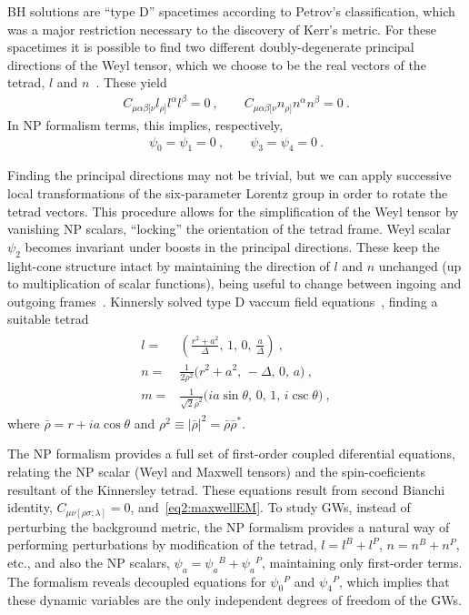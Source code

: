 BH solutions are ``type D'' spacetimes according to Petrov's classification, which was a major restriction necessary to the discovery of Kerr's metric.
For these spacetimes it is possible to find two different doubly-degenerate principal directions of the Weyl tensor, which we choose to be the real vectors of the tetrad, $l$ and $n$~\cite{Chandrasekhar1998}.
These yield
\begin{align}
    C_{\mu\alpha\beta[\nu} l_{\rho]} l^\alpha l^\beta = 0 ~, \qquad C_{\mu\alpha\beta[\nu} n_{\rho]} n^\alpha n^\beta = 0  ~.
\end{align}
In NP formalism terms, this implies, respectively,
\begin{align}
    \psi_0=\psi_1=0 ~,\qquad \psi_3=\psi_4=0 ~.
\end{align}

Finding the principal directions may not be trivial, but we can apply successive local transformations of the six-parameter Lorentz group in order to rotate the tetrad vectors. 
This procedure allows for the simplification of the Weyl tensor by vanishing NP scalars, ``locking'' the orientation of the tetrad frame.
Weyl scalar $\psi_2$ becomes invariant under boosts in the principal directions.
These keep the light-cone structure intact by maintaining the direction of $l$ and $n$ unchanged (up to multiplication of scalar functions), being useful to change between ingoing and outgoing frames~\cite{Teukolsky1974}. 
Kinnersly solved type D vaccum field equations~\cite{Kinnersley1969}, finding a suitable tetrad 
\begin{align}
    \begin{split}
        l =& \left(\frac{r^2+a^2}{\Delta}, \, 1, \,0, \,\frac{a}{\Delta} \right) ~, \\
        n =& \frac{1}{2 \rho^2} \Bigr( r^2+a^2, \,-\Delta, \,0 , \,a \Bigr) ~, \\
        m =& \frac{1}{ \sqrt{2} \bar{\rho}^2 } \Bigr( i a \sin\theta, \,0, \,1, \, i \csc\theta \Bigr) ~,
    \end{split}
    \label{eq3:kinnerslytetrad}
\end{align}
where $\bar{\rho} = r + i a \cos\theta$ and $\rho^2 \equiv | \bar{\rho} |^2 = \bar{\rho} \bar{\rho}^*$.

The NP formalism provides a full set of first-order coupled diferential equations, relating the NP scalar (Weyl and Maxwell tensors) and the spin-coeficients resultant of the Kinnersley tetrad. These equations result from second Bianchi identity, $C_{\mu\nu[\rho \sigma ; \lambda ]} = 0$, and~\eqref{eq2:maxwellEM}.
To study GWs, instead of perturbing the background metric, the NP formalism provides a natural way of performing perturbations by modification of the tetrad, $l=l^B+l^P$, $n=n^B+n^P$, etc., and also the NP scalars, $\psi_a = \psi_a{}^B + \psi_a{}^P$, maintaining only first-order terms.
The formalism reveals decoupled equations for $\psi_0{}^P$ and $\psi_4{}^P$, which implies that these dynamic variables are the only independent degrees of freedom of the GWs.

